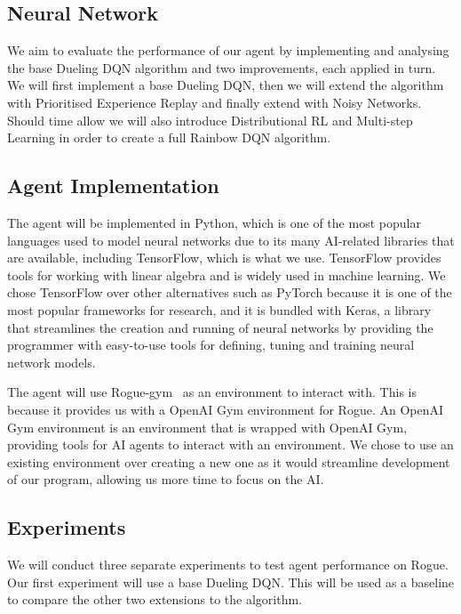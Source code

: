 \documentclass[12pt,a4paper]{article}
\begin{document}
    \subsection{Neural Network}\label{subsec:neural-network}
    We aim to evaluate the performance of our agent by implementing and analysing the base Dueling DQN algorithm and two improvements, each applied in turn.
    We will first implement a base Dueling DQN, then we will extend the algorithm with Prioritised Experience Replay and finally extend with Noisy Networks.
    Should time allow we will also introduce Distributional RL and Multi-step Learning in order to create a full Rainbow DQN algorithm.

    \subsection{Agent Implementation}\label{subsec:implementation}
    The agent will be implemented in Python, which is one of the most popular languages used to model neural networks due to its many AI-related libraries that are available, including TensorFlow, which is what we use.
    TensorFlow provides tools for working with linear algebra and is widely used in machine learning.
    We chose TensorFlow over other alternatives such as PyTorch because it is one of the most popular frameworks for research,
    and it is bundled with Keras, a library that streamlines the creation and running of neural networks by providing the programmer with
    easy-to-use tools for defining, tuning and training neural network models.

    The agent will use Rogue-gym~\citep{kanagawa19} as an environment to interact with.
    This is because it provides us with a OpenAI Gym environment for Rogue.
    An OpenAI Gym environment is an environment that is wrapped with OpenAI Gym, providing tools for AI agents to interact with an environment.
    We chose to use an existing environment over creating a new one as it would streamline development of our program, allowing us more time to focus on the AI.
    
    \subsection{Experiments}\label{subsec:experiments}
    We will conduct three separate experiments to test agent performance on Rogue.
    Our first experiment will use a base Dueling DQN.
    This will be used as a baseline to compare the other two extensions to the algorithm.
\end{document}
